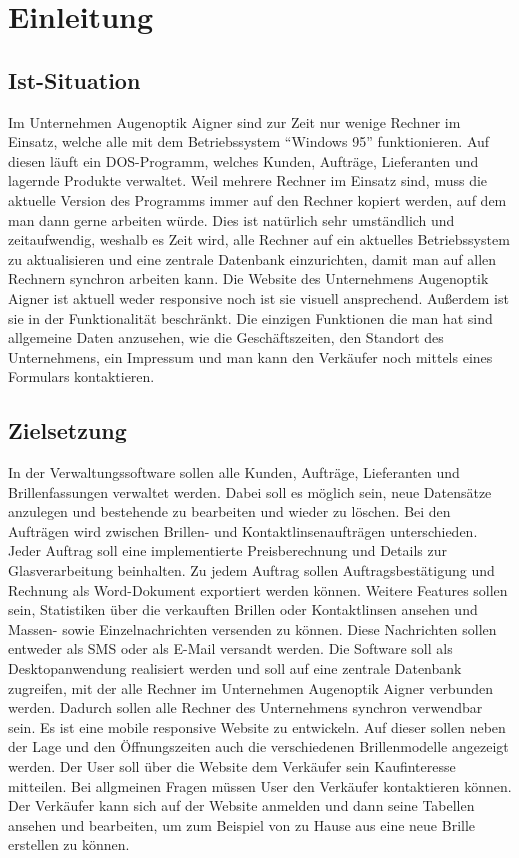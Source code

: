 \chapter{Einleitung}
\section{Ist-Situation}
Im Unternehmen Augenoptik Aigner sind zur Zeit nur wenige Rechner im Einsatz, welche alle mit dem Betriebssystem “Windows 95” funktionieren. Auf diesen läuft ein DOS-Programm, welches Kunden,  Aufträge, Lieferanten und lagernde Produkte  verwaltet. Weil mehrere Rechner im Einsatz sind, muss die aktuelle Version des Programms immer auf den Rechner kopiert werden, auf dem man dann gerne arbeiten würde. Dies ist natürlich sehr umständlich und zeitaufwendig, weshalb es Zeit wird, alle Rechner auf ein aktuelles Betriebssystem zu aktualisieren und eine zentrale Datenbank einzurichten, damit man auf allen Rechnern synchron arbeiten kann.\newline
Die Website des Unternehmens Augenoptik Aigner ist aktuell weder responsive noch ist sie visuell ansprechend. Außerdem ist sie in der Funktionalität beschränkt. Die einzigen Funktionen die man hat sind allgemeine Daten anzusehen, wie die Geschäftszeiten, den Standort des Unternehmens, ein Impressum und man kann den Verkäufer noch mittels eines Formulars kontaktieren. 

\section{Zielsetzung}
In der Verwaltungssoftware sollen alle Kunden, Aufträge, Lieferanten und Brillenfassungen verwaltet werden. Dabei soll es möglich sein, neue Datensätze anzulegen und bestehende zu bearbeiten und wieder zu löschen. Bei den Aufträgen wird zwischen Brillen- und Kontaktlinsenaufträgen unterschieden. Jeder Auftrag soll eine implementierte Preisberechnung und Details zur Glasverarbeitung beinhalten. Zu jedem Auftrag sollen Auftragsbestätigung und Rechnung als Word-Dokument exportiert werden können. \newline Weitere Features sollen sein, Statistiken über die verkauften Brillen oder Kontaktlinsen ansehen und Massen- sowie Einzelnachrichten versenden zu können. Diese Nachrichten sollen entweder als SMS oder als E-Mail versandt werden. \newline Die Software soll als Desktopanwendung realisiert werden und soll auf eine zentrale Datenbank zugreifen, mit der alle Rechner im Unternehmen Augenoptik Aigner verbunden werden. Dadurch sollen alle Rechner des Unternehmens synchron verwendbar sein.
Es ist eine mobile responsive Website zu entwickeln. Auf dieser sollen neben der Lage und den Öffnungszeiten auch die verschiedenen Brillenmodelle angezeigt werden. Der User soll über die Website dem Verkäufer sein Kaufinteresse mitteilen. Bei allgmeinen Fragen müssen User den Verkäufer kontaktieren können. Der Verkäufer kann sich auf der Website anmelden und dann seine Tabellen ansehen und bearbeiten, um zum Beispiel von zu Hause aus eine neue Brille erstellen zu können. 

